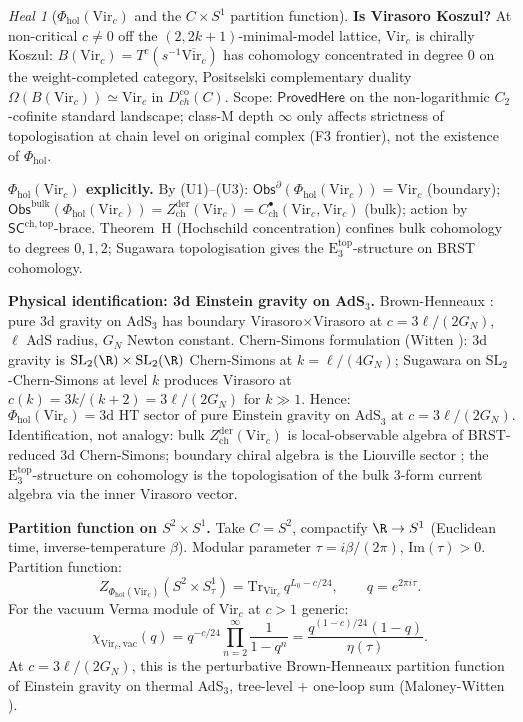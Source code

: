 \documentclass{article}
\theoremstyle{definition}
\theoremstyle{remark}
\newtheorem{heal}[theorem]{Heal}
\newcommand{\SCchtop}{\mathsf{SC}^{\mathrm{ch,top}}}
\newcommand{\Phihol}{\Phi_{\mathrm{hol}}}
\newcommand{\Obs}{\mathsf{Obs}}
\newcommand{\Zder}{Z^{\mathrm{der}}_{\mathrm{ch}}}
\newcommand{\ChirHoch}{C^{\bullet}_{\mathrm{ch}}}
\newcommand{\Etop}[1]{\mathrm{E}_{#1}^{\mathrm{top}}}
\newcommand{\Vir}{\mathrm{Vir}}
\begin{document}
\begin{heal}[$\Phihol(\Vir_c)$ and the $C\times S^1$ partition
function]
\textbf{Is Virasoro Koszul?} At non-critical $c\neq 0$ off the
$(2, 2k+1)$-minimal-model lattice, $\Vir_c$ is chirally Koszul:
$B(\Vir_c) = T^c(s^{-1}\overline{\Vir_c})$ has cohomology
concentrated in degree $0$ on the weight-completed category,
Positselski complementary duality $\Omega(B(\Vir_c)) \simeq \Vir_c$
in $D^{\mathrm{co}}_{ch}(C)$. Scope: $\mathsf{ProvedHere}$ on the
non-logarithmic $C_2$-cofinite standard landscape; class-M depth
$\infty$ only affects strictness of topologisation at chain level on
original complex (F3 frontier), not the existence of $\Phihol$.

\textbf{$\Phihol(\Vir_c)$ explicitly.} By (U1)--(U3):
$\Obs^{\partial}(\Phihol(\Vir_c)) = \Vir_c$ (boundary);
$\Obs^{\mathrm{bulk}}(\Phihol(\Vir_c)) = \Zder(\Vir_c) =
\ChirHoch(\Vir_c, \Vir_c)$ (bulk); action by $\SCchtop$-brace.
Theorem~H (Hochschild concentration) confines bulk cohomology to
degrees $0, 1, 2$; Sugawara topologisation gives the
$\Etop{3}$-structure on BRST cohomology.

\textbf{Physical identification: 3d Einstein gravity on AdS$_3$.}
Brown-Henneaux \cite{BrownHenneaux}: pure 3d gravity on AdS$_3$ has
boundary Virasoro$\times$Virasoro at $c = 3\ell/(2G_N)$, $\ell$ AdS
radius, $G_N$ Newton constant. Chern-Simons formulation (Witten
\cite{Witten3dGravity}): 3d gravity is $\mathrm{SL}_2(\R)\times
\mathrm{SL}_2(\R)$ Chern-Simons at $k = \ell/(4G_N)$; Sugawara
on $\mathrm{SL}_2$-Chern-Simons at level $k$ produces
Virasoro at $c(k) = 3k/(k+2) = 3\ell/(2G_N)$ for $k\gg 1$. Hence:
\[
 \Phihol(\Vir_c) = \text{3d HT sector of pure Einstein gravity on
 AdS}_3 \text{ at } c = 3\ell/(2G_N).
\]
Identification, not analogy: bulk $\Zder(\Vir_c)$ is local-observable
algebra of BRST-reduced 3d Chern-Simons; boundary chiral algebra is
the Liouville sector \cite{CHvD}; the $\Etop{3}$-structure on
cohomology is the topologisation of the bulk 3-form current algebra
via the inner Virasoro vector.

\textbf{Partition function on $S^2\times S^1$.}
Take $C = S^2$, compactify $\R\to S^1$ (Euclidean time,
inverse-temperature $\beta$). Modular parameter
$\tau = i\beta/(2\pi)$, $\mathrm{Im}(\tau)>0$. Partition function:
\begin{equation}\label{eq:vir-partfn}
 Z_{\Phihol(\Vir_c)}(S^2\times S^1_\tau)
 = \mathrm{Tr}_{\Vir_c}\, q^{L_0 - c/24},
 \qquad q = e^{2\pi i\tau}.
\end{equation}
For the vacuum Verma module of $\Vir_c$ at $c>1$ generic:
\begin{equation}\label{eq:vir-char}
 \chi_{\Vir_c, \mathrm{vac}}(q)
 = q^{-c/24}\prod_{n=2}^{\infty}\frac{1}{1-q^n}
 = \frac{q^{(1-c)/24}(1-q)}{\eta(\tau)}.
\end{equation}
At $c = 3\ell/(2G_N)$, this is the perturbative Brown-Henneaux
partition function of Einstein gravity on thermal AdS$_3$,
tree-level + one-loop sum (Maloney-Witten \cite{MaloneyWitten}).


\end{heal}
\end{document}
